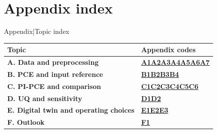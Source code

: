 

\section{Appendix index}

\renewcommand{\backupcode}{Index}

\begin{frame}[more-space,label=backup-index]{Appendix\enspace|\enspace Topic index}

\par\medskip

{\renewcommand{\arraystretch}{1.8}

\begin{tabular}{@{}p{}p{}@{}}

\toprule\textbf{Topic} & \textbf{Appendix codes}\\\midrule

\textbf{A. Data and preprocessing} & \hyperlink{backup-A1}{\color{rwth-blue-100}\textbf{A1}}\quad \hyperlink{backup-A2}{\color{rwth-blue-100}\textbf{A2}}\quad \hyperlink{backup-A3}{\color{rwth-blue-100}\textbf{A3}}\quad \hyperlink{backup-A4}{\color{rwth-blue-100}\textbf{A4}}\quad \hyperlink{backup-A5}{\color{rwth-blue-100}\textbf{A5}}\quad \hyperlink{backup-A6}{\color{rwth-blue-100}\textbf{A6}}\quad \hyperlink{backup-A7}{\color{rwth-blue-100}\textbf{A7}}\\

\textbf{B. PCE and input reference} & \hyperlink{backup-B1}{\color{rwth-blue-100}\textbf{B1}}\quad \hyperlink{backup-B2}{\color{rwth-blue-100}\textbf{B2}}\quad \hyperlink{backup-B3}{\color{rwth-blue-100}\textbf{B3}}\quad \hyperlink{backup-B4}{\color{rwth-blue-100}\textbf{B4}}\\

\textbf{C. PI-PCE and comparison} & \hyperlink{backup-C1}{\color{rwth-blue-100}\textbf{C1}}\quad \hyperlink{backup-C2}{\color{rwth-blue-100}\textbf{C2}}\quad \hyperlink{backup-C3}{\color{rwth-blue-100}\textbf{C3}}\quad \hyperlink{backup-C4}{\color{rwth-blue-100}\textbf{C4}}\quad \hyperlink{backup-C5}{\color{rwth-blue-100}\textbf{C5}}\quad \hyperlink{backup-C6}{\color{rwth-blue-100}\textbf{C6}}\\

\textbf{D. UQ and sensitivity} & \hyperlink{backup-D1}{\color{rwth-blue-100}\textbf{D1}}\quad \hyperlink{backup-D2}{\color{rwth-blue-100}\textbf{D2}}\\

\textbf{E. Digital twin and operating choices} & \hyperlink{backup-E1}{\color{rwth-blue-100}\textbf{E1}}\quad \hyperlink{backup-E2}{\color{rwth-blue-100}\textbf{E2}}\quad \hyperlink{backup-E3}{\color{rwth-blue-100}\textbf{E3}}\\

\textbf{F. Outlook} & \hyperlink{backup-F1}{\color{rwth-blue-100}\textbf{F1}}\\

\bottomrule\end{tabular}}

\medskip

\end{frame}

